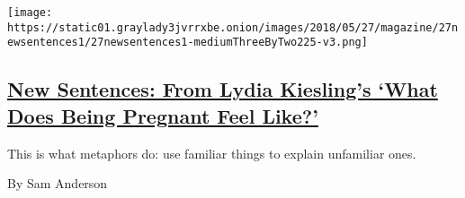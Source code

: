 \begin{enumerate}
  \texttt{[image: https://static01.graylady3jvrrxbe.onion/images/2018/05/27/magazine/27newsentences1/27newsentences1-mediumThreeByTwo225-v3.png]}

  \hypertarget{new-sentences-from-lydia-kieslings-what-does-being-pregnant-feel-like}{%
  \subsection{\texorpdfstring{\href{/2018/05/25/magazine/new-sentences-from-lydia-kieslings-what-does-being-pregnant-feel-like.html}{New
  Sentences: From Lydia Kiesling's `What Does Being Pregnant Feel
  Like?'}}{New Sentences: From Lydia Kiesling's `What Does Being Pregnant Feel Like?'}}\label{new-sentences-from-lydia-kieslings-what-does-being-pregnant-feel-like}}

  This is what metaphors do: use familiar things to explain unfamiliar
  ones.

  By Sam Anderson
\end{enumerate}

